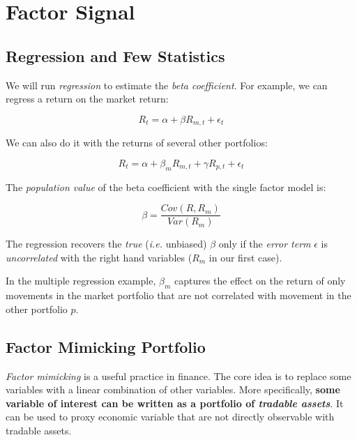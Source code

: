\chapter{Factor Signal}

\section{Regression and Few Statistics}

We will run \textit{regression} to estimate the 
\textit{beta coefficient}. For example, we can 
regress a return on the market return:

\begin{equation}
    R_{t} = \alpha + \beta R_{m,t} + \epsilon_{t}
\end{equation}

We can also do it with the returns of several other portfolios:

\begin{equation}
    R_{t} = \alpha + \beta_m R_{m,t} + \gamma R_{p,t} + \epsilon_{t}
\end{equation}

The \textit{population value} of the beta coefficient with the single factor model is:

\begin{equation}
    \beta = \frac{Cov(R,R_m)}{Var(R_m)}
\end{equation}

The regression recovers the \textit{true} (\textit{i.e.} unbiased) 
$\beta$ only if the \textit{error term} $\epsilon$ is \textit{uncorrelated}
with the right hand variables ($R_m$ in our first case).

In the multiple regression example, 
$\beta_m$ captures the effect on the return of only movements in the market portfolio 
that are not correlated with movement in the other portfolio $p$.


\section{Factor Mimicking Portfolio}

\textit{Factor mimicking} is a useful practice in finance. 
The core idea is to replace some variables with 
a linear combination of other variables. More
specifically, \textbf{some variable of interest can be
written as a portfolio of \textit{tradable assets}}.
It can be used to proxy economic variable that 
are not directly observable with tradable assets.

